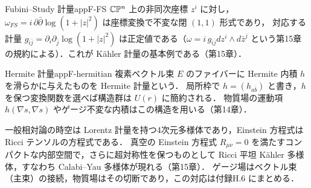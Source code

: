 \begin{myex}{Fubini--Study 計量}{appF-FS}
$\mathbb{C}\mathbb{P}^n$ 上の非同次座標 $z^i$ に対し，$\omega_{FS}=i\,\partial\bar\partial\log(1+|z|^2)$ は座標変換で不変な閉 $(1,1)$ 形式であり，
対応する計量 $g_{i\bar j}=\partial_i\partial_{\bar j}\log(1+|z|^2)$ は正定値である（$\omega=i\,g_{i\bar j}dz^i\wedge d\bar z^j$ という第15章の規約による）．これが Kähler 計量の基本例である（第15章）．
\end{myex}

\begin{myex}{Hermite 計量}{appF-hermitian}
複素ベクトル束 $E$ のファイバーに Hermite 内積 $h$ を滑らかに与えたものを Hermite 計量という．
局所枠で $h=(h_{a\bar b})$ と書き，$h$ を保つ変換関数を選べば構造群は $U(r)$ に簡約される．
物質場の運動項 $h(\nabla s,\nabla s)$ やゲージ不変な内積はこの構造を用いる（第14章）．
\end{myex}

\begin{physbox}
一般相対論の時空は Lorentz 計量を持つ4次元多様体であり，Einstein 方程式は Ricci テンソルの方程式である．
真空の Einstein 方程式 $R_{\mu\nu}=0$ を満たすコンパクトな内部空間で，さらに超対称性を保つものとして
Ricci 平坦 Kähler 多様体，すなわち Calabi--Yau 多様体が現れる（第15章）．
ゲージ場はベクトル束（主束）の接続，物質場はその切断であり，この対応は付録H.6 にまとめる．
\end{physbox}
